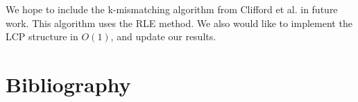 \documentclass[preprint,12pt]{elsarticle}
\begin{document}
We hope to include the k-mismatching algorithm from Clifford et al. \cite{Undone} in future work.
This algorithm uses the RLE method.
We also would like to implement the LCP structure in $O(1)$,
and update our results.


\section*{Bibliography}









\end{document}
